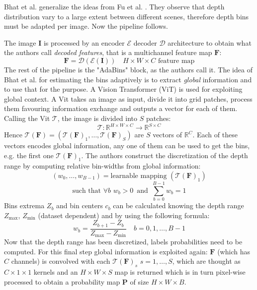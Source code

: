 \newpage
Bhat et al. \cite{AdaBins} generalize the ideas from Fu et al. \cite{ordinal_regression}.
They observe that depth distribution vary to a large extent between different scenes, therefore depth bins must be adapted per image.
Now the pipeline follows.

The image $\mathbf{I}$ is processed by an encoder $\mathcal{E}$ decoder $\mathcal{D}$ architecture to obtain what the authors call \textit{decoded features}, that is a multichannel feature map $\mathbf{F}$:
\[
	\mathbf{F} = \mathcal{D}(\mathcal{E}(\mathbf{I})) \quad H \times W \times C \text{ feature map}
\]
The rest of the pipeline is the "AdaBins" block, as the authors call it.
The idea of Bhat et al. for estimating the bins adaptively is to extract \textit{global} information and to use that for the purpose.
A Vision Transformer (ViT) \cite{ViT} is used for exploiting global context.
A Vit takes an image as input, divide it into grid patches, process them favouring information exchange and outputs a vector for each of them. Calling the Vit $\mathcal{T}$, the image is divided into $S$ patches:
\[
	\mathcal{T}: \mathbb{R}^{H \times W \times C} \rightarrow \mathbb{R}^{S \times C}
\]
Hence $\mathcal{T}(\mathbf{F}) = (\mathcal{T}(\mathbf{F})_{1}, \dotsc, \mathcal{T}(\mathbf{F})_{S})$ are $S$ vectors of $\mathbb{R}^{C}$.
Each of these vectors encodes global information, any one of them can be used to get the bins, e.g. the first one $\mathcal{T}(\mathbf{F})_{1}$.
The authors construct the discretization of the depth range by computing relative bin-widths from global information:
\[
	(w_{0}, \dotsc, w_{B-1}) = \text{learnable mapping }(\mathcal{T}(\mathbf{F})_{1})
\]\[
	\text{such that } \forall b \,\, w_{b} > 0 \, \text{ and } \, \sum_{b=0}^{B-1} w_{b} = 1
\]
Bins extrema $Z_{b}$ and bin centers $c_{b}$ can be calculated knowing the depth range $Z_{\text{max}}$, $Z_{\text{min}}$ (dataset dependent) and by using the following formula:
\[
	w_{b} = \frac{Z_{b+1} - Z_{b}}{Z_{\text{max}} - Z_{\text{min}}} \quad b=0, 1, \dotsc, B-1
\]
Now that the depth range has been discretized, labels probabilities need to be computed.
For this final step global information is exploited again: $\mathbf{F}$ (which has $C$ channels) is convolved with each $\mathcal{T}(\mathbf{F})_{s}$ $s=1,\dotsc,S$, which are thought as $C \times 1 \times 1$ kernels and an $H \times W \times S$ map is returned which is in turn pixel-wise processed to obtain a probability map $\mathbf{P}$ of size $H \times W \times B$.

